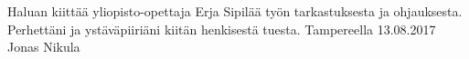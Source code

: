 Haluan kiittää yliopisto-opettaja Erja Sipilää työn tarkastuksesta ja
ohjauksesta. Perhettäni ja ystäväpiiriäni kiitän henkisestä tuesta.
\vspace{25mm}
\newline
Tampereella 13.08.2017
\newline
Jonas Nikula
